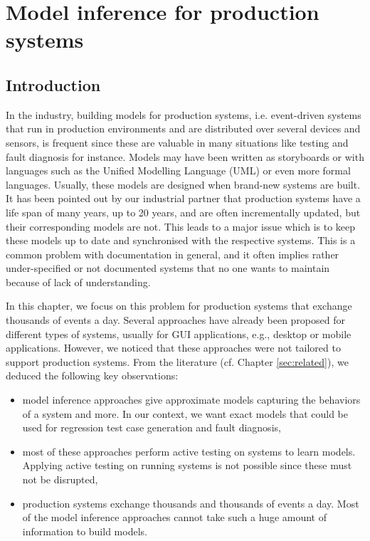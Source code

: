 %
\chapter{Model inference for production systems}
\label{sec:modelinf:prodsystems}

\section{Introduction}

In the industry, building models for production systems, i.e.
event-driven systems that run in production environments and are
distributed over several devices and sensors, is frequent since
these are valuable in many situations like testing and fault
diagnosis for instance. Models may have been written as
storyboards or with languages such as the Unified Modelling
Language (UML) or even more formal languages. Usually, these
models are designed when brand-new systems are built. It has been
pointed out by our industrial partner that production systems
have a life span of many years, up to 20 years, and are often
incrementally updated, but their corresponding models are not.
This leads to a major issue which is to keep these models up to
date and synchronised with the respective systems. This is a
common problem with documentation in general, and it often
implies rather under-specified or not documented systems that no
one wants to maintain because of lack of understanding.

In this chapter, we focus on this problem for production systems
that exchange thousands of events a day. Several approaches have
already been proposed for different types of systems, usually for
GUI applications, e.g., desktop or mobile applications. However,
we noticed that these approaches were not tailored to support
production systems. From the literature (cf. Chapter
\ref{sec:related}), we deduced the following key observations:

\begin{itemize}
    \item model inference approaches give approximate models
    capturing the behaviors of a system and more. In our
    context, we want exact models that could be used for
    regression test case generation and fault diagnosis,

    \item most of these approaches perform active testing on
    systems to learn models. Applying active testing on running
    systems is not possible since these must not be disrupted,

    \item production systems exchange thousands and thousands of
    events a day. Most of the model inference approaches cannot
    take such a huge amount of information to build models.
\end{itemize}

